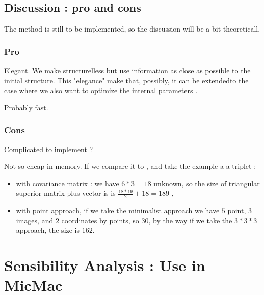 
\subsection{Discussion : pro and cons}

The method is still to be implemented, so the discussion will be a bit theoreticall.


\subsubsection{Pro}

Elegant.  We make structurelless but use information as close as possible to the initial structure.
This "elegance" make that, possibly, it can be extendedto the case where we also want to
optimize the internal parameters .

Probably fast.

\subsubsection{Cons}

Complicated to implement ?

Not so cheap in memory. If we compare it to \cite{StrLessPoint}, and take the example a a triplet :

\begin{itemize}
   \item with covariance matrix : we have $6*3=18$ unknown, so the size of triangular
        superior  matrix plus vector is is $\frac{18*19}{2} +18 = 189$ ,
         
   \item with point approach, if we take the minimalist approach we have $5$ point, $3$ images,
         and $2$ coordinates by points, so $30$, by the way if we take the $3*3*3$ approach,
         the size is $162$.
\end{itemize}




\section{Sensibility Analysis : Use in MicMac}

